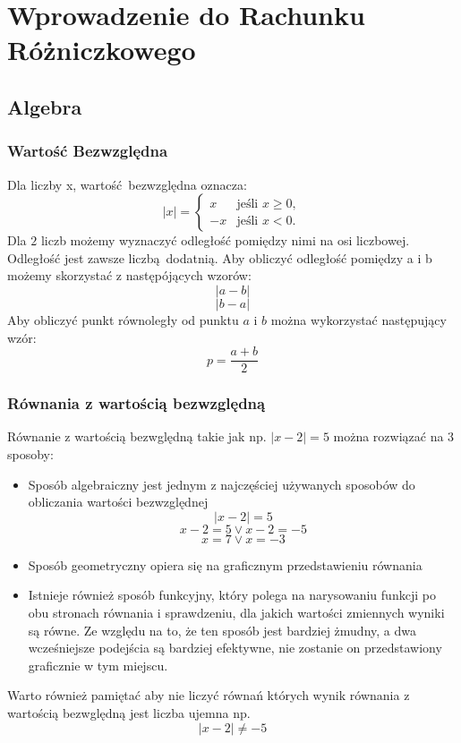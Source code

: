 \documentclass[12pt, a4paper]{article}
\begin{document}
\tableofcontents
\newpage
\section{Wprowadzenie do Rachunku Różniczkowego}
\subsection{Algebra}
\subsubsection{Wartość Bezwzględna}
Dla liczby x, wartość bezwzględna oznacza:
$$
|x| =
\begin{cases} 
  x & \text{jeśli } x \geq 0, \\
  -x & \text{jeśli } x < 0.
\end{cases}
$$
Dla $2$ liczb możemy wyznaczyć odległość pomiędzy nimi na osi liczbowej. Odległość jest zawsze liczbą dodatnią.
Aby obliczyć odległość pomiędzy a i b możemy skorzystać z następójących wzorów:
$$\left|a-b\right|$$
$$\left|b-a\right|$$
Aby obliczyć punkt równoległy od punktu $a$ i $b$ można wykorzystać następujący wzór:
$$p = \frac{a+b}{2}$$
\subsubsection{Równania z wartością bezwzględną}
Równanie z wartością bezwględną takie jak np. $\left|x-2\right|=5$ można rozwiązać na 3 sposoby:
\begin{itemize}
  \item Sposób algebraiczny jest jednym z najczęściej używanych sposobów do obliczania wartości bezwzględnej
      $$\left|x-2\right|=5$$
      $$x-2=5 \vee x-2=-5$$
      $$x=7\vee x=-3$$
\newpage
  \item Sposób geometryczny opiera się na graficznym przedstawieniu równania
    \begin{center}
    \end{center}
  \item Istnieje również sposób funkcyjny, który polega na narysowaniu funkcji po
        obu stronach równania i sprawdzeniu, dla jakich wartości zmiennych wyniki są
        równe. Ze względu na to, że ten sposób jest bardziej żmudny, a dwa wcześniejsze
        podejścia są bardziej efektywne, nie zostanie on przedstawiony graficznie w tym miejscu.
\end{itemize}
Warto również pamiętać aby nie liczyć równań których wynik równania z wartością bezwględną jest liczba ujemna np.
$$\left|x-2\right|\neq-5$$
\end{document}
